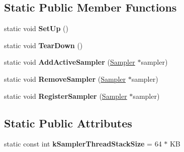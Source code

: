 \subsection*{Static Public Member Functions}
\begin{DoxyCompactItemize}
\item 
static void {\bfseries Set\+Up} ()\hypertarget{classv8_1_1internal_1_1_sampler_thread_a165be0ab4e47a58417fd0cd14a564cc9}{}\label{classv8_1_1internal_1_1_sampler_thread_a165be0ab4e47a58417fd0cd14a564cc9}

\item 
static void {\bfseries Tear\+Down} ()\hypertarget{classv8_1_1internal_1_1_sampler_thread_af5b3127fbcd9d62dc1050470cd62b8dc}{}\label{classv8_1_1internal_1_1_sampler_thread_af5b3127fbcd9d62dc1050470cd62b8dc}

\item 
static void {\bfseries Add\+Active\+Sampler} (\hyperlink{classv8_1_1internal_1_1_sampler}{Sampler} $\ast$sampler)\hypertarget{classv8_1_1internal_1_1_sampler_thread_a2940cf2fca12b63d25de4b4b815fa8cd}{}\label{classv8_1_1internal_1_1_sampler_thread_a2940cf2fca12b63d25de4b4b815fa8cd}

\item 
static void {\bfseries Remove\+Sampler} (\hyperlink{classv8_1_1internal_1_1_sampler}{Sampler} $\ast$sampler)\hypertarget{classv8_1_1internal_1_1_sampler_thread_afc9a170882989ff7b20de54971cbca04}{}\label{classv8_1_1internal_1_1_sampler_thread_afc9a170882989ff7b20de54971cbca04}

\item 
static void {\bfseries Register\+Sampler} (\hyperlink{classv8_1_1internal_1_1_sampler}{Sampler} $\ast$sampler)\hypertarget{classv8_1_1internal_1_1_sampler_thread_a555b90b01fbb1761cb1c1c59497a46e0}{}\label{classv8_1_1internal_1_1_sampler_thread_a555b90b01fbb1761cb1c1c59497a46e0}

\end{DoxyCompactItemize}
\subsection*{Static Public Attributes}
\begin{DoxyCompactItemize}
\item 
static const int {\bfseries k\+Sampler\+Thread\+Stack\+Size} = 64 $\ast$ KB\hypertarget{classv8_1_1internal_1_1_sampler_thread_afd75dabf3f8f54bf2b9cf934a16b19b2}{}\label{classv8_1_1internal_1_1_sampler_thread_afd75dabf3f8f54bf2b9cf934a16b19b2}

\end{DoxyCompactItemize}
